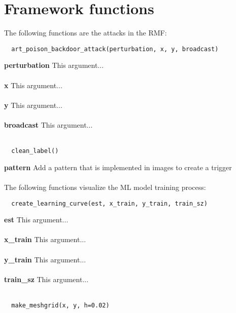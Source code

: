 \section{Framework functions}
\label{sec:frame_func}

The following functions are the attacks in the RMF: \\

\begin{lstlisting}
  art_poison_backdoor_attack(perturbation, x, y, broadcast)
\end{lstlisting}

\noindent\textbf{perturbation}
This argument... \\ \\
\textbf{x}
This argument... \\ \\
\textbf{y}
This argument... \\ \\
\textbf{broadcast}
This argument... \\ \\

\begin{lstlisting}
  clean_label()
\end{lstlisting}

\noindent\textbf{pattern}
Add a pattern that is implemented in images to create a trigger \\ \\

The following functions visualize the ML model training process: \\

\begin{lstlisting}
  create_learning_curve(est, x_train, y_train, train_sz)
\end{lstlisting}

\noindent\textbf{est}
This argument... \\ \\
\textbf{x\_train}
This argument... \\ \\
\textbf{y\_train}
This argument... \\ \\
\textbf{train\_sz}
This argument... \\ \\

\begin{lstlisting}
  make_meshgrid(x, y, h=0.02)
\end{lstlisting}

